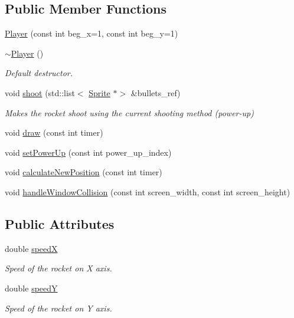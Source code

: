 \subsection*{Public Member Functions}
\begin{DoxyCompactItemize}
\item 
\hyperlink{classPlayer_a7d6d9f5784b5971d9848a9349b6ef377}{Player} (const int beg\+\_\+x=1, const int beg\+\_\+y=1)
\item 
\hyperlink{classPlayer_a749d2c00e1fe0f5c2746f7505a58c062}{$\sim$\+Player} ()
\begin{DoxyCompactList}\small\item\em Default destructor. \end{DoxyCompactList}\item 
void \hyperlink{classPlayer_a5bb630935b83b66406b87149e7087a00}{shoot} (std\+::list$<$ \hyperlink{classSprite}{Sprite} $\ast$$>$ \&bullets\+\_\+ref)
\begin{DoxyCompactList}\small\item\em Makes the rocket shoot using the current shooting method (power-\/up) \end{DoxyCompactList}\item 
void \hyperlink{classPlayer_a856a5c64a431661946ba01b84c969289}{draw} (const int timer)
\item 
void \hyperlink{classPlayer_a52e8800e4216f0d78c497e90412779d2}{set\+Power\+Up} (const int power\+\_\+up\+\_\+index)
\item 
void \hyperlink{classPlayer_a574659d927fef4b34544b728c1631433}{calculate\+New\+Position} (const int timer)
\item 
void \hyperlink{classPlayer_a0646b0f8b1db49816338d0be18175fbe}{handle\+Window\+Collision} (const int screen\+\_\+width, const int screen\+\_\+height)
\end{DoxyCompactItemize}
\subsection*{Public Attributes}
\begin{DoxyCompactItemize}
\item 
double \hyperlink{classPlayer_ad688128863db33f5e527d7e434f557d7}{speedX}
\begin{DoxyCompactList}\small\item\em Speed of the rocket on X axis. \end{DoxyCompactList}\item 
double \hyperlink{classPlayer_abf2d9f3b437bda111c089c01e4b03017}{speedY}
\begin{DoxyCompactList}\small\item\em Speed of the rocket on Y axis. \end{DoxyCompactList}\end{DoxyCompactItemize}
